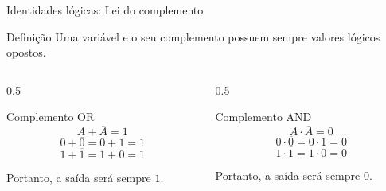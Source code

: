 
\begin{frame}{Identidades lógicas: Lei do complemento}
    \begin{block}{Definição}
        Uma variável e o seu complemento possuem sempre valores lógicos
        opostos.
    \end{block}

    \begin{columns}[T]

        \begin{column}{0.5\textwidth}
            \begin{block}{Complemento OR}
                \[
                    \boxed{A + \overline{A} = 1}
                \]
                \[
                    0 + \overline{0}
                    = 0 + 1 = 1
                \]
                \[
                    1 + \overline{1}
                    = 1 + 0 = 1
                \]

                Portanto, a saída será sempre $1$.
            \end{block}
        \end{column}

        \begin{column}{0.5\textwidth}
            \begin{block}{Complemento AND}
                \[
                    \boxed{A \cdot \overline{A} = 0}
                \]
                \[
                    0 \cdot \overline{0}
                    = 0 \cdot 1 = 0
                \]
                \[
                    1 \cdot \overline{1}
                    = 1 \cdot 0 = 0
                \]

                Portanto, a saída será sempre $0$.
            \end{block}
        \end{column}

    \end{columns}

\end{frame}